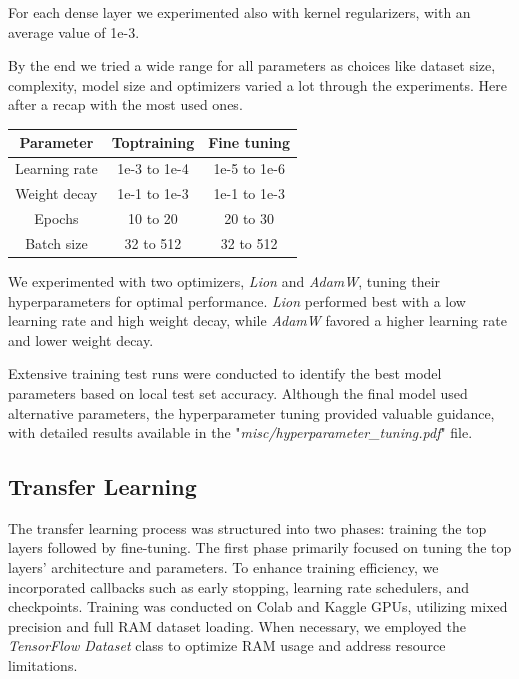 \documentclass[11pt]{article}
\begin{document}
\begin{multicols}{2}
        For each dense layer we experimented also with kernel regularizers, with an average value of 1e-3.
        
        By the end we tried a wide range for all parameters as choices like dataset size, complexity, model size and optimizers varied a lot through the experiments.
        Here after a recap with the most used ones.
        
        \begin{table}[H]
            \centering
            \setlength{\tabcolsep}{5pt}
            \small
            \begin{tabular}{|c|c|c|}
                \hline
                \textbf{Parameter} & \textbf{Toptraining} & \textbf{Fine tuning} \\ \hline
                Learning rate & 1e-3 to 1e-4 & 1e-5 to 1e-6 \\ \hline
                Weight decay & 1e-1 to 1e-3 & 1e-1 to 1e-3 \\ \hline
                Epochs & 10 to 20 & 20 to 30 \\ \hline
                Batch size & 32 to 512 & 32 to 512 \\ \hline
            \end{tabular}
        \end{table}
        
        We experimented with two optimizers, \textit{Lion} and \textit{AdamW}, tuning their hyperparameters for optimal performance. \textit{Lion} performed best with a low learning rate and high weight decay, while \textit{AdamW} favored a higher learning rate and lower weight decay.

        Extensive training test runs were conducted to identify the best model parameters based on local test set accuracy. Although the final model used alternative parameters, the hyperparameter tuning provided valuable guidance, with detailed results available in the "\textit{misc/hyperparameter\_tuning.pdf}" file.

        \subsection{Transfer Learning}
        
        The transfer learning process was structured into two phases: training the top layers followed by fine-tuning. The first phase primarily focused on tuning the top layers' architecture and parameters. To enhance training efficiency, we incorporated callbacks such as early stopping, learning rate schedulers, and checkpoints. Training was conducted on Colab\cite{colab2024} and Kaggle\cite{kaggle2024} GPUs, utilizing mixed precision and full RAM dataset loading. When necessary, we employed the \textit{TensorFlow Dataset}\cite{tensorflow2015} class to optimize RAM usage and address resource limitations.
        

\end{multicols}
\end{document}

